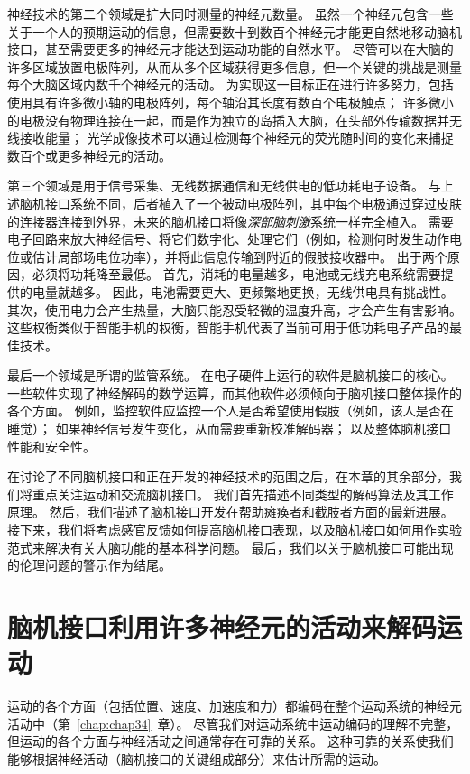 神经技术的第二个领域是扩大同时测量的神经元数量。 
虽然一个神经元包含一些关于一个人的预期运动的信息，但需要数十到数百个神经元才能更自然地移动脑机接口，甚至需要更多的神经元才能达到运动功能的自然水平。
尽管可以在大脑的许多区域放置电极阵列，从而从多个区域获得更多信息，但一个关键的挑战是测量每个大脑区域内数千个神经元的活动。
为实现这一目标正在进行许多努力，包括使用具有许多微小轴的电极阵列，每个轴沿其长度有数百个电极触点； 许多微小的电极没有物理连接在一起，而是作为独立的岛插入大脑，在头部外传输数据并无线接收能量；
光学成像技术可以通过检测每个神经元的荧光随时间的变化来捕捉数百个或更多神经元的活动。


第三个领域是用于信号采集、无线数据通信和无线供电的低功耗电子设备。
与上述脑机接口系统不同，后者植入了一个被动电极阵列，其中每个电极通过穿过皮肤的连接器连接到外界，未来的脑机接口将像\textit{深部脑刺激}系统一样完全植入。
需要电子回路来放大神经信号、将它们数字化、处理它们（例如，检测何时发生动作电位或估计局部场电位功率），并将此信息传输到附近的假肢接收器中。
出于两个原因，必须将功耗降至最低。
首先，消耗的电量越多，电池或无线充电系统需要提供的电量就越多。
因此，电池需要更大、更频繁地更换，无线供电具有挑战性。
其次，使用电力会产生热量，大脑只能忍受轻微的温度升高，才会产生有害影响。
这些权衡类似于智能手机的权衡，智能手机代表了当前可用于低功耗电子产品的最佳技术。


最后一个领域是所谓的监管系统。
在电子硬件上运行的软件是脑机接口的核心。 
一些软件实现了神经解码的数学运算，而其他软件必须倾向于脑机接口整体操作的各个方面。
例如，监控软件应监控一个人是否希望使用假肢（例如，该人是否在睡觉）；
如果神经信号发生变化，从而需要重新校准解码器；
以及整体脑机接口性能和安全性。


在讨论了不同脑机接口和正在开发的神经技术的范围之后，在本章的其余部分，我们将重点关注运动和交流脑机接口。 
我们首先描述不同类型的解码算法及其工作原理。
然后，我们描述了脑机接口开发在帮助瘫痪者和截肢者方面的最新进展。 
接下来，我们将考虑感官反馈如何提高脑机接口表现，以及脑机接口如何用作实验范式来解决有关大脑功能的基本科学问题。
最后，我们以关于脑机接口可能出现的伦理问题的警示作为结尾。



\section{脑机接口利用许多神经元的活动来解码运动}

运动的各个方面（包括位置、速度、加速度和力）都编码在整个运动系统的神经元活动中（第~\ref{chap:chap34}~章）。
尽管我们对运动系统中运动编码的理解不完整，但运动的各个方面与神经活动之间通常存在可靠的关系。
这种可靠的关系使我们能够根据神经活动（脑机接口的关键组成部分）来估计所需的运动。


